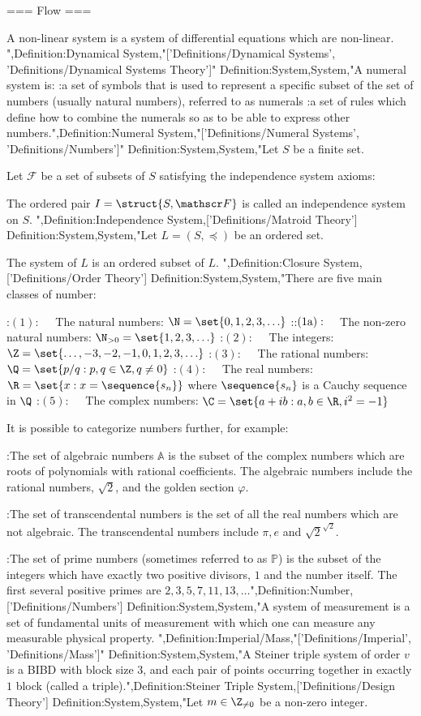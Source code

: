=== Flow ===

A non-linear system is a system of differential equations which are non-linear.
",Definition:Dynamical System,"['Definitions/Dynamical Systems', 'Definitions/Dynamical Systems Theory']"
Definition:System,System,"A numeral system is:
:a set of symbols that is used to represent a specific subset of the set of numbers (usually natural numbers), referred to as numerals
:a set of rules which define how to combine the numerals so as to be able to express other numbers.",Definition:Numeral System,"['Definitions/Numeral Systems', 'Definitions/Numbers']"
Definition:System,System,"Let $S$ be a finite set.

Let $\mathscr F$ be a set of subsets of $S$ satisfying the independence system axioms:


The ordered pair $I = \struct {S, \mathscr F}$ is called an independence system on $S$.
",Definition:Independence System,['Definitions/Matroid Theory']
Definition:System,System,"Let $L = \left({S, \preceq}\right)$ be an ordered set.


The system of $L$ is an ordered subset of $L$.
",Definition:Closure System,['Definitions/Order Theory']
Definition:System,System,"There are five main classes of number:

:$(1): \quad$ The natural numbers: $\N = \set {0, 1, 2, 3, \ldots}$
::$(1 \text a): \quad$ The non-zero natural numbers: $\N_{>0} = \set {1, 2, 3, \ldots}$
:$(2): \quad$ The integers: $\Z = \set {\ldots, -3, -2, -1, 0, 1, 2, 3, \ldots}$
:$(3): \quad$ The rational numbers: $\Q = \set {p / q: p, q \in \Z, q \ne 0}$
:$(4): \quad$ The real numbers: $\R = \set {x: x = \sequence {s_n} }$ where $\sequence {s_n}$ is a Cauchy sequence in $\Q$
:$(5): \quad$ The complex numbers: $\C = \set {a + i b: a, b \in \R, i^2 = -1}$


It is possible to categorize numbers further, for example:

:The set of algebraic numbers $\mathbb A$ is the subset of the complex numbers which are roots of polynomials with rational coefficients.  The algebraic numbers include the rational numbers, $\sqrt 2$, and the golden section $\varphi$.

:The set of transcendental numbers is the set of all the real numbers which are not algebraic.  The transcendental numbers include $\pi, e$ and $\sqrt 2^{\sqrt 2}$.

:The set of prime numbers (sometimes referred to as $\mathbb P$) is the subset of the integers which have exactly two positive divisors, $1$ and the number itself.  The first several positive primes are $2, 3, 5, 7, 11, 13, \ldots$",Definition:Number,['Definitions/Numbers']
Definition:System,System,"A system of measurement is a set of fundamental units of measurement with which one can measure any measurable physical property.
",Definition:Imperial/Mass,"['Definitions/Imperial', 'Definitions/Mass']"
Definition:System,System,"A Steiner triple system of order $v$ is a BIBD with block size $3$, and each pair of points occurring together in exactly $1$ block (called a triple).",Definition:Steiner Triple System,['Definitions/Design Theory']
Definition:System,System,"Let $m \in \Z_{\ne 0}$ be a non-zero integer.


